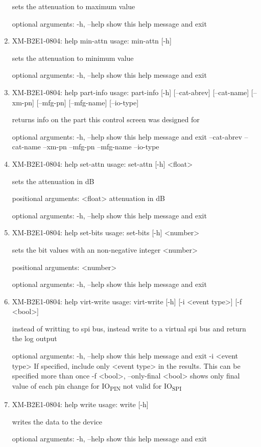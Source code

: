 \documentclass[11pt]{article}
\begin{document}
\begin{enumerate}
sets the attenuation to maximum value

optional arguments:
  -h, --help  show this help message and exit

\item XM-B2E1-0804: help min-attn
\label{sec:org7ec8440}
usage: min-attn [-h]

sets the attenuation to minimum value

optional arguments:
  -h, --help  show this help message and exit

\item XM-B2E1-0804: help part-info
\label{sec:orge81c8fe}
usage: part-info  [-h] [--cat-abrev] [--cat-name] [--xm-pn] [--mfg-pn] [--mfg-name]
        [--io-type]

returns info on the part this control screen was designed for

optional arguments:
  -h, --help   show this help message and exit
  --cat-abrev
  --cat-name
  --xm-pn
  --mfg-pn
  --mfg-name
  --io-type

\item XM-B2E1-0804: help set-attn
\label{sec:org721beab}
usage: set-attn [-h] <float>

sets the attenuation in dB

positional arguments:
  <float>     attenuation in dB

optional arguments:
  -h, --help  show this help message and exit

\item XM-B2E1-0804: help set-bits
\label{sec:org846486b}
usage: set-bits [-h] <number>

sets the bit values with an non-negative integer <number>

positional arguments:
  <number>

optional arguments:
  -h, --help  show this help message and exit

\item XM-B2E1-0804: help virt-write
\label{sec:org7d7db83}
usage: virt-write [-h] [-i <event type>] [-f <bool>]

instead of writting to spi bus, instead write to a virtual spi bus and return
the log output

optional arguments:
  -h, --help            show this help message and exit
  -i <event type>       If specified, include only <event type> in the
                        results. This can be specified more than once
  -f <bool>, --only-final <bool>
                        shows only final value of each pin change for IO\textsubscript{PIN}
                        not valid for IO\textsubscript{SPI}

\item XM-B2E1-0804: help write
\label{sec:org598ec72}
usage: write [-h]

writes the data to the device

optional arguments:
  -h, --help  show this help message and exit
\end{enumerate}
\end{document}
